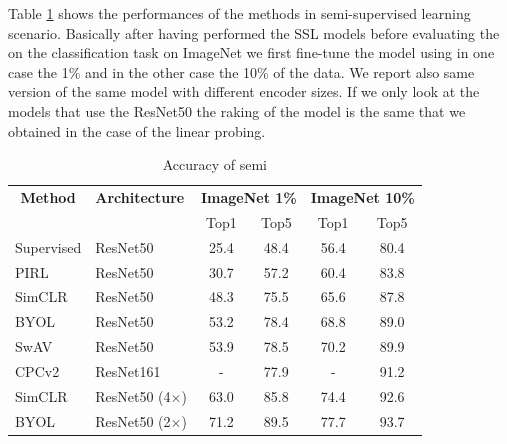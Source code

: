 Table \ref{tab:imagenet-1-perc-semisup} shows the performances of the methods in semi-supervised learning scenario. Basically after having performed the SSL models before evaluating the on the classification task on ImageNet we first fine-tune the model using in one case the 1\% and in the other case the 10\% of the data. We report also same version of the same model with different encoder sizes. If we only look at the models that use the ResNet50 the raking of the model is the same that we obtained in the case of the linear probing.

\begin{table}[H]
	\centering
	\begin{tabular}{|l|l|cc|cc|}
		\hline
		\multicolumn{1}{|c|}{\textbf{Method}} & \textbf{Architecture} & \multicolumn{2}{c|}{\textbf{ImageNet 1\%}} & \multicolumn{2}{c|}{\textbf{ImageNet 10\%}} \\
		\multicolumn{1}{|c|}{} &  & Top1 & Top5 & Top1 & Top5  \\
		\hline
		Supervised & ResNet50 & 25.4 & 48.4 & 56.4 & 80.4 \\
		PIRL & ResNet50 & 30.7 & 57.2  & 60.4 & 83.8 \\
		SimCLR & ResNet50 & 48.3 & 75.5  & 65.6 & 87.8 \\
		BYOL & ResNet50  & 53.2 & 78.4  & 68.8 & 89.0 \\ 
		SwAV & ResNet50 & 53.9 & 78.5  & 70.2 & 89.9 \\
		CPCv2 & ResNet161 & - & 77.9 & - & 91.2 \\
		SimCLR & ResNet50 (4$\times$) & 63.0 & 85.8 & 74.4 & 92.6 \\
		BYOL & ResNet50 (2$\times$) & 71.2 & 89.5 & 77.7 & 93.7 \\
		\hline
	\end{tabular}
	\caption{Accuracy of semi }
	\label{tab:imagenet-1-perc-semisup}
\end{table}


